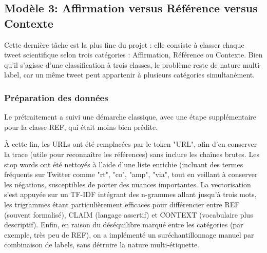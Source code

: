 \subsection{Modèle 3: Affirmation versus Référence versus Contexte}\label{subsec:modele-3:-claim-vs-ref-vs-contexte}
Cette dernière tâche est la plus fine du projet : elle consiste à classer chaque tweet scientifique selon trois catégories : Affirmation, Référence ou Contexte.
Bien qu’il s’agisse d’une classification à trois classes, le problème reste de nature multi-label, car un même tweet peut appartenir à plusieurs catégories simultanément.

\subsubsection{Préparation des données}
Le prétraitement a suivi une démarche classique, avec une étape supplémentaire pour la classe REF, qui était moins bien prédite.

\noindent À cette fin, les URLs ont été remplacées par le token "URL", afin d’en conserver la trace (utile pour reconnaître les références) sans inclure les chaînes brutes.
Les stop words ont été nettoyés à l’aide d’une liste enrichie (incluant des termes fréquents sur Twitter comme "rt", "co", "amp", "via", tout en veillant à conserver les négations, susceptibles de porter des nuances importantes.
La vectorisation s’est appuyée sur un TF-IDF intégrant des n-grammes allant jusqu’à trois mots, les trigrammes étant particulièrement efficaces pour différencier entre REF (souvent formalisé), CLAIM (langage 	assertif) et CONTEXT (vocabulaire plus descriptif).
Enfin, en raison du déséquilibre marqué entre les catégories (par exemple, très peu de REF), on a implémenté un suréchantillonnage manuel par combinaison de labels, sans détruire la nature multi-étiquette.

